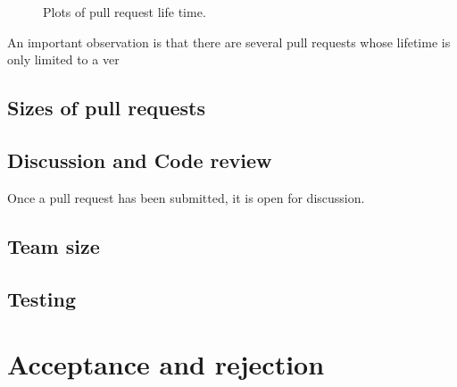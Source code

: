 \documentclass[conference]{IEEEtran}
\begin{document}
\begin{figure*}
\centering
{}
\caption{Plots of pull request life time.}
\end{figure*}


An important observation is that there are several pull requests whose
lifetime is only limited to a ver

\subsection{Sizes of pull requests}

\subsection{Discussion and Code review}

Once a pull request has been submitted, it is open for discussion.

\subsection{Team size}

\subsection{Testing}

\section{Acceptance and rejection}
\end{document}
